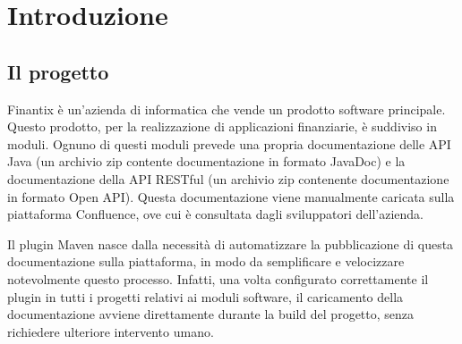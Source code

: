 
\chapter{Introduzione}
\label{cap:introduzione}





\section{Il progetto}   \label{secProgetto}
Finantix è un'azienda di informatica che vende un prodotto software principale.
Questo prodotto, per la realizzazione di applicazioni finanziarie, è suddiviso in moduli.
Ognuno di questi moduli prevede una propria documentazione delle API Java (un archivio zip contente documentazione in formato JavaDoc) e la documentazione della API RESTful (un archivio zip contenente documentazione in formato Open API).
Questa documentazione viene manualmente caricata sulla piattaforma Confluence, ove cui è consultata dagli sviluppatori dell'azienda.

Il plugin Maven nasce dalla necessità di automatizzare la pubblicazione di questa documentazione sulla piattaforma, in modo da semplificare e velocizzare notevolmente questo processo.
Infatti, una volta configurato correttamente il plugin in tutti i progetti relativi ai moduli software, il caricamento della documentazione avviene direttamente durante la build del progetto, senza richiedere ulteriore intervento umano.

